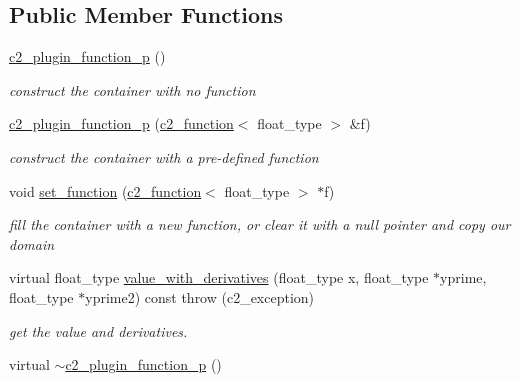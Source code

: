 \subsection*{Public Member Functions}
\begin{DoxyCompactItemize}
\item 
\hypertarget{classc2__plugin__function__p_aead9e593b067ffcb7387b350db7ea920}{\hyperlink{classc2__plugin__function__p_aead9e593b067ffcb7387b350db7ea920}{c2\-\_\-plugin\-\_\-function\-\_\-p} ()}\label{classc2__plugin__function__p_aead9e593b067ffcb7387b350db7ea920}

\begin{DoxyCompactList}\small\item\em construct the container with no function \end{DoxyCompactList}\item 
\hypertarget{classc2__plugin__function__p_a6b2825f01dffa6eaf84f7d4355a97f03}{\hyperlink{classc2__plugin__function__p_a6b2825f01dffa6eaf84f7d4355a97f03}{c2\-\_\-plugin\-\_\-function\-\_\-p} (\hyperlink{classc2__function}{c2\-\_\-function}$<$ float\-\_\-type $>$ \&f)}\label{classc2__plugin__function__p_a6b2825f01dffa6eaf84f7d4355a97f03}

\begin{DoxyCompactList}\small\item\em construct the container with a pre-\/defined function \end{DoxyCompactList}\item 
\hypertarget{classc2__plugin__function__p_a5d06682ac3e78308631700b1cde961ef}{void \hyperlink{classc2__plugin__function__p_a5d06682ac3e78308631700b1cde961ef}{set\-\_\-function} (\hyperlink{classc2__function}{c2\-\_\-function}$<$ float\-\_\-type $>$ $\ast$f)}\label{classc2__plugin__function__p_a5d06682ac3e78308631700b1cde961ef}

\begin{DoxyCompactList}\small\item\em fill the container with a new function, or clear it with a null pointer and copy our domain \end{DoxyCompactList}\item 
virtual float\-\_\-type \hyperlink{classc2__plugin__function__p_a7a5f8926ecec5b73f32ad5f90cefe80e}{value\-\_\-with\-\_\-derivatives} (float\-\_\-type x, float\-\_\-type $\ast$yprime, float\-\_\-type $\ast$yprime2) const   throw (c2\-\_\-exception)
\begin{DoxyCompactList}\small\item\em get the value and derivatives. \end{DoxyCompactList}\item 
\hypertarget{classc2__plugin__function__p_aac74d9e2221ee6b8fee5adc579960530}{virtual \hyperlink{classc2__plugin__function__p_aac74d9e2221ee6b8fee5adc579960530}{$\sim$c2\-\_\-plugin\-\_\-function\-\_\-p} ()}\label{classc2__plugin__function__p_aac74d9e2221ee6b8fee5adc579960530}


\end{DoxyCompactItemize}
